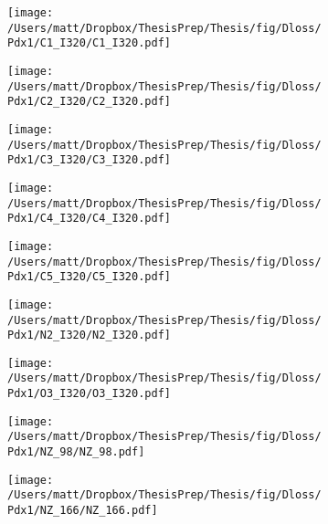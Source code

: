 \begin{figure}
\begin{subfigure}{.25\textwidth}
  \centering
  \texttt{[image: /Users/matt/Dropbox/ThesisPrep/Thesis/fig/Dloss/Pdx1/C1\_I320/C1\_I320.pdf]}
  \caption{}
  \label{fig:sfig1}
\end{subfigure}%
\begin{subfigure}{.25\textwidth}
  \centering
  \texttt{[image: /Users/matt/Dropbox/ThesisPrep/Thesis/fig/Dloss/Pdx1/C2\_I320/C2\_I320.pdf]}
  \caption{}
  \label{fig:sfig2}
\end{subfigure}
\begin{subfigure}{.25\textwidth}
  \centering
  \texttt{[image: /Users/matt/Dropbox/ThesisPrep/Thesis/fig/Dloss/Pdx1/C3\_I320/C3\_I320.pdf]}
  \caption{}
  \label{fig:sfig3}
\end{subfigure}%
\begin{subfigure}{.25\textwidth}
  \centering
  \texttt{[image: /Users/matt/Dropbox/ThesisPrep/Thesis/fig/Dloss/Pdx1/C4\_I320/C4\_I320.pdf]}
  \caption{}
  \label{fig:sfig4}
\end{subfigure}
\begin{subfigure}{.25\textwidth}
  \centering
  \texttt{[image: /Users/matt/Dropbox/ThesisPrep/Thesis/fig/Dloss/Pdx1/C5\_I320/C5\_I320.pdf]}
  \caption{}
  \label{fig:sfig5}
\end{subfigure}%
\begin{subfigure}{.25\textwidth}
  \centering
  \texttt{[image: /Users/matt/Dropbox/ThesisPrep/Thesis/fig/Dloss/Pdx1/N2\_I320/N2\_I320.pdf]}
  \caption{}
  \label{fig:sfig6}
\end{subfigure}
\begin{subfigure}{.25\textwidth}
  \centering
  \texttt{[image: /Users/matt/Dropbox/ThesisPrep/Thesis/fig/Dloss/Pdx1/O3\_I320/O3\_I320.pdf]}
  \caption{}
  \label{fig:sfig7}
\end{subfigure}%
\begin{subfigure}{.25\textwidth}
  \centering
  \texttt{[image: /Users/matt/Dropbox/ThesisPrep/Thesis/fig/Dloss/Pdx1/NZ\_98/NZ\_98.pdf]}
  \caption{}
  \label{fig:sfig8}
\end{subfigure}
\begin{subfigure}{.5\textwidth}
  \centering
  \texttt{[image: /Users/matt/Dropbox/ThesisPrep/Thesis/fig/Dloss/Pdx1/NZ\_166/NZ\_166.pdf]}
  \caption{}
  \label{fig:sfig9}
\end{subfigure}%

\end{figure}
